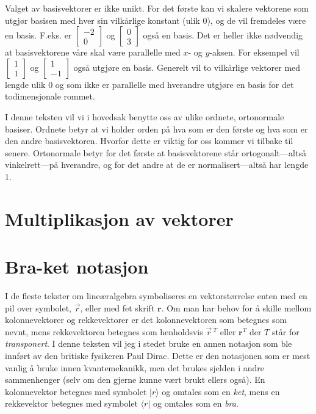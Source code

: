 Valget av basisvektorer er ikke unikt. For det første kan vi skalere vektorene som utgjør basisen med hver sin vilkårlige konstant (ulik 0), og de vil fremdeles være en basis. F.eks. er $\left[\begin{array}{c} -2 \\ 0 \end{array}\right]$ og $\left[\begin{array}{c} 0 \\ 3 \end{array}\right]$ også en basis. Det er heller ikke nødvendig at basisvektorene våre skal være parallelle med $x$- og $y$-aksen. For eksempel vil $\left[\begin{array}{c} 1 \\ 1 \end{array}\right]$ og $\left[\begin{array}{c} 1 \\ -1 \end{array}\right]$ også utgjøre en basis. Generelt vil to vilkårlige vektorer med lengde ulik 0 og som ikke er parallelle med hverandre utgjøre en basis for det todimensjonale rommet. 

I denne teksten vil vi i hovedsak benytte oss av ulike ordnete, ortonormale basiser. Ordnete betyr at vi holder orden på hva som er den første og hva som er den andre basisvektoren. Hvorfor dette er viktig for oss kommer vi tilbake til senere. Ortonormale betyr for det første at basisvektorene står ortogonalt---altså vinkelrett---på hverandre, og for det andre at de er normalisert---altså har lengde 1. 

\section{Multiplikasjon av vektorer}

\section{Bra-ket notasjon}
I de fleste tekster om lineæralgebra symboliseres en vektorstørrelse enten med en pil over symbolet, $\vec{r}$, eller med fet skrift $\mathbf{r}$. Om man har behov for å skille mellom kolonnevektorer og rekkevektorer er det kolonnevektoren som betegnes som nevnt, mens rekkevektoren betegnes som henholdsvis $\vec{r}\,^T$ eller $\mathbf{r}^T$ der $T$ står for \emph{transponert}. I denne teksten vil jeg i stedet bruke en annen notasjon som ble innført av den britiske fysikeren Paul Dirac. Dette er den notasjonen som er mest vanlig å bruke innen kvantemekanikk, men det brukes sjelden i andre sammenhenger (selv om den gjerne kunne vært brukt ellers også). En kolonnevektor betegnes med symbolet $|r\rangle$ og omtales som en \emph{ket}, mens en rekkevektor betegnes med symbolet $\langle r|$ og omtales som en \emph{bra}. 

